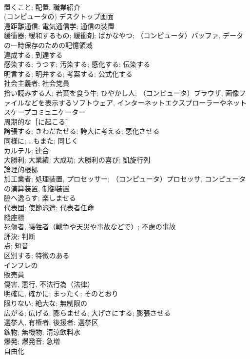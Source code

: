 \documentclass[8pt]{extreport}
\begin{document}
\begin{CJK}{UTF8}{min}
\\	置くこと; 配置; 職業紹介	
\\	(コンピュータの) デスクトップ画面	
\\	遠距離通信; 電気通信学; 通信の装置	
\\	緩衝器; 緩和するもの; 緩衝剤; ばかなやつ; （コンピュータ）バッファ, データの一時保存のための記憶領域	
\\	達成する; 到達する	
\\	感染する; うつす; 汚染する; 感化する; 伝染する	
\\	明言する; 明弁する; 考案する; 公式化する	
\\	社会主義者; 社会党員	
\\	拾い読みする人; 若葉を食う牛; ひやかし人; （コンピュータ）ブラウザ, 画像ファイルなどを表示するソフトウェア, インターネットエクスプローラーやネットスケープコミュニケーター	
\\	周期的な［に起こる］	
\\	誇張する; きわだたせる; 誇大に考える; 悪化させる	
\\	同様に; …もまた; 同じく	
\\	カルテル; 連合	
\\	大勝利; 大業績; 大成功; 大勝利の喜び; 凱旋行列	
\\	論理的根拠	
\\	加工業者; 処理装置, プロセッサー; （コンピュータ）プロセッサ, コンピュータの演算装置, 制御装置	
\\	脇へ逸らす; 楽しませる	
\\	代表団; 使節派遣; 代表者任命	
\\	縦座標	
\\	死傷者, 犠牲者（戦争や天災や事故などで）; 不慮の事故	
\\	評決; 判断	
\\	点; 短音	
\\	区別する; 特徴のある	
\\	インフレの	
\\	販売員	
\\	傷害, 悪行, 不法行為（法律）	
\\	明確に, 確かに; まったく; そのとおり	
\\	限りない; 絶大な; 無制限の	
\\	広がる; 広げる; 膨らませる; 大げさにする; 膨張させる	
\\	選挙人, 有権者; 後援者; 選挙区	
\\	鉱物; 無機物; 清涼飲料水	
\\	爆発; 爆発音; 急増	
\\	自由化

\end{CJK}
\end{document}
